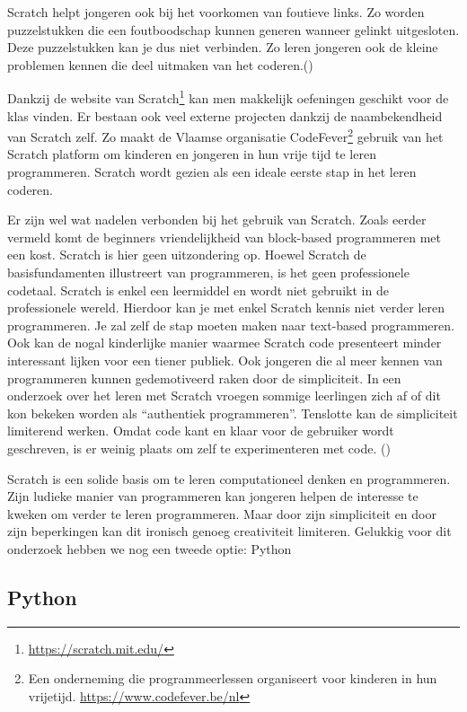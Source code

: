 Scratch helpt jongeren ook bij het voorkomen van foutieve links. Zo worden puzzelstukken die een foutboodschap kunnen generen wanneer gelinkt uitgesloten. Deze puzzelstukken kan je dus niet verbinden. Zo leren jongeren ook de kleine problemen kennen die deel uitmaken van het coderen.(\cite{Maloney2010})

Dankzij de website van Scratch\footnote{\url{https://scratch.mit.edu/}} kan men makkelijk oefeningen geschikt voor de klas vinden. Er bestaan ook veel externe projecten dankzij de naambekendheid van Scratch zelf. Zo maakt de Vlaamse organisatie CodeFever\footnote{Een onderneming die programmeerlessen organiseert voor kinderen in hun vrijetijd. \url{https://www.codefever.be/nl}} gebruik van het Scratch platform om kinderen en jongeren in hun vrije tijd te leren programmeren. Scratch wordt gezien als een ideale eerste stap in het leren coderen.

Er zijn wel wat nadelen verbonden bij het gebruik van Scratch. Zoals eerder vermeld komt de beginners vriendelijkheid van block-based programmeren met een kost. Scratch is hier geen uitzondering op. Hoewel Scratch de basisfundamenten illustreert van programmeren, is het geen professionele codetaal. Scratch is enkel een leermiddel en wordt niet gebruikt in de professionele wereld. Hierdoor kan je met enkel Scratch kennis niet verder leren programmeren. Je zal zelf de stap moeten maken naar text-based programmeren.
Ook kan de nogal kinderlijke manier waarmee Scratch code presenteert minder interessant lijken voor een tiener publiek. Ook jongeren die al meer kennen van programmeren kunnen gedemotiveerd raken door de simpliciteit. In een onderzoek over het leren met Scratch vroegen sommige leerlingen zich af of dit kon bekeken worden als “authentiek programmeren”. 
Tenslotte kan de simpliciteit limiterend werken. Omdat code kant en klaar voor de gebruiker wordt geschreven, is er weinig plaats om zelf te experimenteren met code. (\cite{Armoni2015,Fagan2017})

Scratch is een solide basis om te leren computationeel denken en programmeren. Zijn ludieke manier van programmeren kan jongeren helpen de interesse te kweken om verder te leren programmeren. Maar door zijn simpliciteit en door zijn beperkingen kan dit ironisch genoeg creativiteit limiteren. Gelukkig voor dit onderzoek hebben we nog een tweede optie: Python

\subsection{Python}

